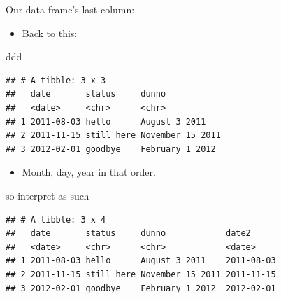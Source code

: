 \documentclass[
  ignorenonframetext,
]{beamer}
\newenvironment{Shaded}{\begin{snugshade}}{\end{snugshade}}
\newcommand{\DataTypeTok}[1]{\textcolor[rgb]{0.13,0.29,0.53}{#1}}
\newcommand{\KeywordTok}[1]{\textcolor[rgb]{0.13,0.29,0.53}{\textbf{#1}}}
\newcommand{\NormalTok}[1]{#1}
\newcommand{\OperatorTok}[1]{\textcolor[rgb]{0.81,0.36,0.00}{\textbf{#1}}}
\newcommand{\StringTok}[1]{\textcolor[rgb]{0.31,0.60,0.02}{#1}}
\providecommand{\tightlist}{%
  \setlength{\itemsep}{0pt}\setlength{\parskip}{0pt}}
\begin{document}
\begin{frame}[fragile]{Our data frame's last column:}
\protect\hypertarget{our-data-frames-last-column}{}

\begin{itemize}
\tightlist
\item
  Back to this:
\end{itemize}

\begin{Shaded}
\begin{Highlighting}[]
\NormalTok{ddd}
\end{Highlighting}
\end{Shaded}

\begin{verbatim}
## # A tibble: 3 x 3
##   date       status     dunno           
##   <date>     <chr>      <chr>           
## 1 2011-08-03 hello      August 3 2011   
## 2 2011-11-15 still here November 15 2011
## 3 2012-02-01 goodbye    February 1 2012
\end{verbatim}

\begin{itemize}
\tightlist
\item
  Month, day, year in that order.
\end{itemize}

\end{frame}

\begin{frame}[fragile]{so interpret as such}
\protect\hypertarget{so-interpret-as-such}{}

\begin{Shaded}
\end{Shaded}

\begin{verbatim}
## # A tibble: 3 x 4
##   date       status     dunno            date2     
##   <date>     <chr>      <chr>            <date>    
## 1 2011-08-03 hello      August 3 2011    2011-08-03
## 2 2011-11-15 still here November 15 2011 2011-11-15
## 3 2012-02-01 goodbye    February 1 2012  2012-02-01
\end{verbatim}

\end{frame}
\end{document}
